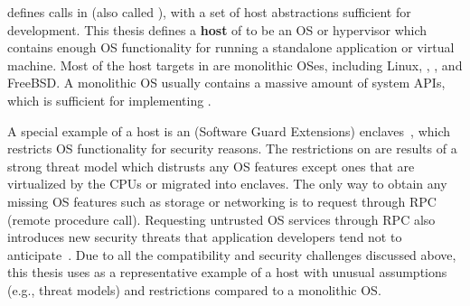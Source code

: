  

\graphene{} defines \palcallnum{} calls in \thehostabi{} (also called \hostapis{}),
with a set of host abstractions
sufficient for \libos{} development.
This thesis defines
a {\bf host} of \thehostabi{}
to be an OS or hypervisor
which contains enough OS functionality for running a standalone application or virtual machine.
Most of the host targets in \graphene{}
are monolithic OSes,
including Linux, \win{}, \osx{}, and FreeBSD.
A monolithic OS 
usually contains a massive amount of system APIs,
which is sufficient for
implementing \thehostabi{}.


A special example of a host
is an \sgx{} (Software Guard Extensions) enclaves~\cite{intelsgx},
which
restricts OS functionality for security reasons.
The restrictions on \sgx{}
are results of a strong threat model
which distrusts any OS features except ones that are virtualized by the CPUs or migrated into enclaves.
The only way to obtain any missing OS features such as storage or networking
is to request through RPC (remote procedure call).
Requesting untrusted OS services through RPC also introduces new security threats that application developers tend not to anticipate~\cite{checkoway13iago,osdi16scone}.
Due to all the compatibility and security challenges discussed above,
this thesis uses \sgx{} as a representative example of a host
with unusual assumptions (e.g., threat models) and restrictions
compared to a monolithic OS.




